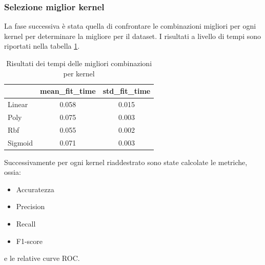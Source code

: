\subsubsection{Selezione miglior kernel}
La fase successiva è stata quella di confrontare le combinazioni migliori per ogni
kernel per determinare la migliore per il dataset. I risultati a livello di tempi sono
riportati nella tabella \ref{tab:top_time_kernels_corr}.
\begin{table}[!ht]
    \centering
    \begin{tabular}{@{}lcc@{}}
        \toprule
        \rowcolor[HTML]{EFEFEF}
        \multicolumn{1}{c}{\cellcolor[HTML]{EFEFEF}\textbf{kernel}} & \textbf{mean\_fit\_time} & \textbf{std\_fit\_time} \\ \midrule
        Linear                                                      & 0.058                    & 0.015                   \\
        Poly                                                        & 0.075                    & 0.003                   \\
        Rbf                                                         & 0.055                    & 0.002                   \\
        Sigmoid                                                     & 0.071                    & 0.003                   \\ \bottomrule
    \end{tabular}
    \caption{Risultati dei tempi delle migliori combinazioni per kernel}
    \label{tab:top_time_kernels_corr}
\end{table}

Successivamente per ogni kernel riaddestrato sono state calcolate
le metriche, ossia:
\begin{itemize}
    \item Accuratezza
    \item Precision
    \item Recall
    \item F1-score
\end{itemize}
e le relative curve ROC.

